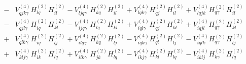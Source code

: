 \documentclass[aps,prl]{revtex4-2}
\begin{document}
\begin{align*}
    -& V^{\left(4\right)}_{qjk\gamma}H^{\left(2\right)}_{lq}H^{\left(2\right)}_{il} - V^{\left(4\right)}_{ljq\gamma}H^{\left(2\right)}_{kq}H^{\left(2\right)}_{il} + V^{\left(4\right)}_{lqk\gamma}H^{\left(2\right)}_{qj}H^{\left(2\right)}_{il}+V^{\left(4\right)}_{lqjk}H^{\left(2\right)}_{q\gamma}H^{\left(2\right)}_{il}\\
    -& V^{\left(4\right)}_{qjl\gamma}H^{\left(2\right)}_{iq}H^{\left(2\right)}_{kl} - V^{\left(4\right)}_{ijq\gamma}H^{\left(2\right)}_{lq}H^{\left(2\right)}_{kl} + V^{\left(4\right)}_{iql\gamma}H^{\left(2\right)}_{qj}H^{\left(2\right)}_{kl}+V^{\left(4\right)}_{iqjl}H^{\left(2\right)}_{q\gamma}H^{\left(2\right)}_{kl}\\
    +&V^{\left(4\right)}_{qlk\gamma}H^{\left(2\right)}_{iq}H^{\left(2\right)}_{lj} + V^{\left(4\right)}_{ilq\gamma}H^{\left(2\right)}_{kq}H^{\left(2\right)}_{lj} - V^{\left(4\right)}_{iqk\gamma}H^{\left(2\right)}_{ql}H^{\left(2\right)}_{lj}-V^{\left(4\right)}_{iqlk}H^{\left(2\right)}_{q\gamma}H^{\left(2\right)}_{lj}\\
    +&V^{\left(4\right)}_{klj\gamma}H^{\left(2\right)}_{ik}H^{\left(2\right)}_{lq} + V^{\left(4\right)}_{ilk\gamma}H^{\left(2\right)}_{jk}H^{\left(2\right)}_{lq} -V^{\left(4\right)}_{ikj\gamma}H^{\left(2\right)}_{kl}H^{\left(2\right)}_{lq}-V^{\left(4\right)}_{iklj}H^{\left(2\right)}_{k\gamma}H^{\left(2\right)}_{lq}\\
    \end{align*}
\end{document}
